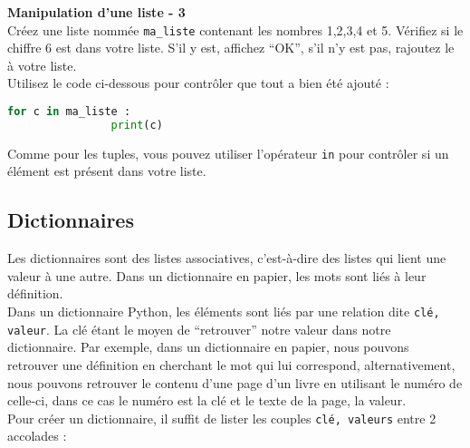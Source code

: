     \begin{Exercice}[5 minutes] \textbf{Manipulation d'une liste - 3}\\
       Créez une liste nommée \lstinline{ma_liste} contenant les nombres 1,2,3,4 et 5. Vérifiez si le chiffre 6 est dans votre liste. S'il y est, affichez ``OK'', s'il n'y est pas, rajoutez le à votre liste. \\
       
       Utilisez le code ci-dessous pour contrôler que tout a bien été ajouté : \\
       
       \begin{lstlisting}[language=Python]
            for c in ma_liste :
            	print(c)   \end{lstlisting}
    
        \begin{conseil}
            Comme pour les tuples, vous pouvez utiliser l'opérateur \lstinline{in} pour contrôler si un élément est présent dans votre liste.
        \end{conseil}
        
        \begin{solution}
             
        \end{solution}
    \end{Exercice}

	\subsection{Dictionnaires}
	Les dictionnaires sont des listes associatives, c’est-à-dire des listes qui lient une valeur à une autre. Dans un dictionnaire en papier, les mots sont liés à leur définition. \\
	
	Dans un dictionnaire Python, les éléments sont liés par une relation dite \lstinline{clé, valeur}. La clé étant le moyen de “retrouver” notre valeur dans notre dictionnaire. Par exemple, dans un dictionnaire en papier, nous pouvons retrouver une définition en cherchant le mot qui lui correspond, alternativement, nous pouvons retrouver le contenu d’une page d’un livre en utilisant le numéro de celle-ci, dans ce cas le numéro est la clé et le texte de la page, la valeur. \\
	
	Pour créer un dictionnaire, il suffit de lister les couples \lstinline{clé, valeurs} entre 2 accolades : \\
	
